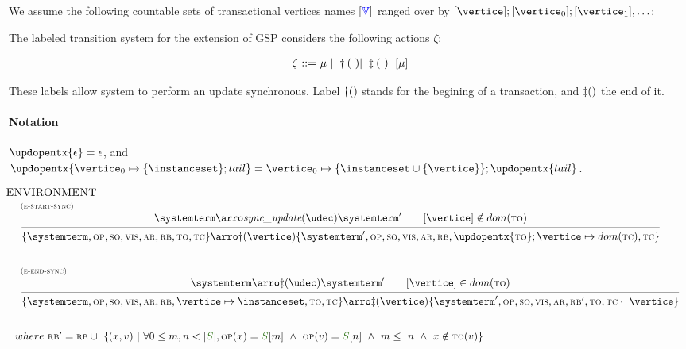 We assume the following countable sets of transactional vertices names $[\textcolor{blue}{\mathbb{V}}]$ ranged over by $[\vertice];[\vertice_0];[\vertice_1],\ldots$;

The labeled transition system for the extension of GSP considers the following actions $\zeta$:	

\[ 
\begin{array}{r@{\ ::= \ }l}
  \zeta & \mu \ | \ \startsynctran \ | \ \finishsynctran  \ | \  [\mu] \\
\end{array}
\]

These labels allow system to perform an update synchronous. Label $\startsynctran$ stands for the begining of a transaction, and $\finishsynctran$ the end of it.

\paragraph{Notation} $\updopentx{\epsilon} = \epsilon$, and 
   $\updopentx{\vertice_0 \mapsto \{\instanceset\};tail} = \vertice_0 \mapsto \{\instanceset \cup \{\vertice\}\};\updopentx{tail}$.
		
		
 \[
 \begin{array}{l}    \hspace{-.3cm} \textsc{ENVIRONMENT}\\

		
\mathrule{e-start-sync}{\systemterm \arroi{\syncupdtran{\tupdate}} \systemterm' \qquad [\vertice] \notin 
dom(\tx)}{\environmenttran{\systemterm}{\op}{\so}{\vis}{\arb}{\rb}{\tx}{\tc} \arroi{\startsynctran{\vertice}} \environmenttran{\systemterm'}{\op}{\so}{\vis}{\arb}{\rb}{\updopentx{\tx};\vertice \mapsto dom(\tc)}{\tc}}

 \\[35pt]
{
\mathrule{e-end-sync}{\systemterm \arroi{\finishsynctran{\tupdate}} \systemterm' \qquad [\vertice] \in 
dom(\tx)}{\environmenttran{\systemterm}{\op}{\so}{\vis}{\arb}{\rb}{\vertice \mapsto \instanceset,\tx}{\tc} \arroi{\finishsynctran{\vertice}} \environmenttran{\systemterm'}{\op}{\so}{\vis}{\arb}{\rb'}{\tx}{\tc \cdot\ \vertice}}}
\\
 \\[10pt]where \ 
\rb' = \rb \cup\ \{ (x,v) \ | \ \forall 0 \leq m,n < |\queuemessage|, \op(x) = \queuemessage[m] \ \land \ \op(v) = \queuemessage[n] \ \land \ m \leq\ n \ \land \ x\notin\tx(v) \}
 \end{array}
 \]


